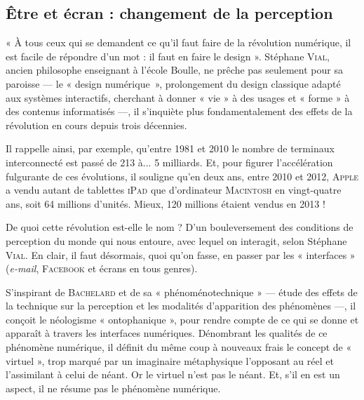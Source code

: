 
\subsection[Être et écran]{Être et écran : changement de la perception}
\label{sub:II.4.2}

« À tous ceux qui se demandent ce qu’il faut faire de la révolution numérique, il est facile de répondre d’un mot : il faut en faire le design ». Stéphane \textsc{Vial}, ancien philosophe enseignant à l’école Boulle, ne prêche pas seulement pour sa paroisse --- le « design numérique~», prolongement du design classique adapté aux systèmes interactifs, cherchant à donner « vie » à des usages et « forme » à des contenus informatisés ---, il s’inquiète plus fondamentalement des effets de la révolution en cours depuis trois décennies.

Il rappelle ainsi, par exemple, qu’entre 1981 et 2010 le nombre de terminaux interconnecté est passé de 213 à... 5 milliards. Et, pour figurer l’accélération fulgurante de ces évolutions, il souligne qu’en deux ans, entre 2010 et 2012, \textsc{Apple} a vendu autant de tablettes \textsc{iPad} que d’ordinateur \textsc{Macintosh} en vingt-quatre ans, soit 64 millions d’unités. Mieux, 120 millions étaient vendus en 2013 !

De quoi cette révolution est-elle le nom ? D’un bouleversement des conditions de perception du monde qui nous entoure, avec lequel on interagit, selon Stéphane \textsc{Vial}. En clair, il faut désormais, quoi qu’on fasse, en passer par les « interfaces » (\textit{e-mail}, \textsc{Facebook} et écrans en tous genres).



S’inspirant de \textsc{Bachelard} et de sa « phénoménotechnique » --- étude des effets de la technique sur la perception et les modalités d’apparition des phénomènes ---, il conçoit le néologisme « ontophanique », pour rendre compte de ce qui se donne et apparaît à travers les interfaces numériques. Dénombrant les qualités de ce phénomène numérique, il définit du même coup à nouveaux frais le concept de « virtuel », trop marqué par un imaginaire métaphysique l’opposant au réel et l’assimilant à celui de néant. Or le virtuel n’est pas le néant. Et, s’il en est un aspect, il ne résume pas le phénomène numérique.


